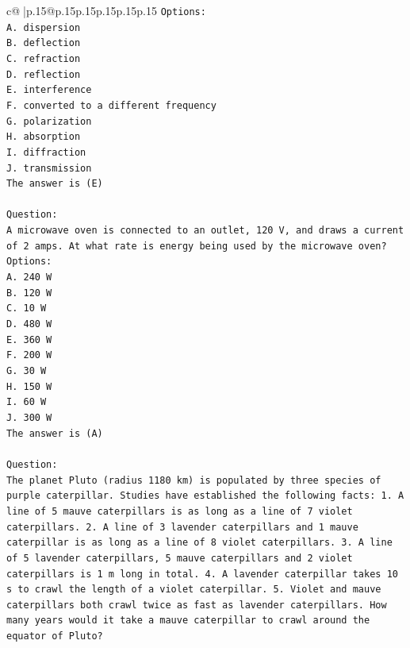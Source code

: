 \documentclass{article}
\begin{document}
{\begin{supertabular}{c@{$\;$}|p{.15\linewidth}@{}p{.15\linewidth}p{.15\linewidth}p{.15\linewidth}p{.15\linewidth}p{.15\linewidth}}
{{{\texttt{Options:} \\
\texttt{A. dispersion} \\
\texttt{B. deflection} \\
\texttt{C. refraction} \\
\texttt{D. reflection} \\
\texttt{E. interference} \\
\texttt{F. converted to a different frequency} \\
\texttt{G. polarization} \\
\texttt{H. absorption} \\
\texttt{I. diffraction} \\
\texttt{J. transmission} \\
\texttt{The answer is (E)} \\
\\ 
\texttt{Question:} \\
\texttt{A microwave oven is connected to an outlet, 120 V, and draws a current of 2 amps. At what rate is energy being used by the microwave oven?} \\
\texttt{Options:} \\
\texttt{A. 240 W} \\
\texttt{B. 120 W} \\
\texttt{C. 10 W} \\
\texttt{D. 480 W} \\
\texttt{E. 360 W} \\
\texttt{F. 200 W} \\
\texttt{G. 30 W} \\
\texttt{H. 150 W} \\
\texttt{I. 60 W} \\
\texttt{J. 300 W} \\
\texttt{The answer is (A)} \\
\\ 
\texttt{Question:} \\
\texttt{The planet Pluto (radius 1180 km) is populated by three species of purple caterpillar. Studies have established the following facts: 1. A line of 5 mauve caterpillars is as long as a line of 7 violet caterpillars. 2. A line of 3 lavender caterpillars and 1 mauve caterpillar is as long as a line of 8 violet caterpillars. 3. A line of 5 lavender caterpillars, 5 mauve caterpillars and 2 violet caterpillars is 1 m long in total. 4.  A lavender caterpillar takes 10 s to crawl the length of a violet caterpillar. 5. Violet and mauve caterpillars both crawl twice as fast as lavender caterpillars. How many years would it take a mauve caterpillar to crawl around the equator of Pluto?} \\
}}}
\end{supertabular}}
\end{document}

